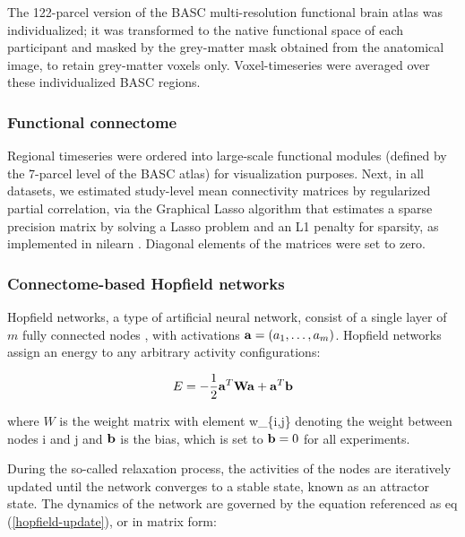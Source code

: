 \documentclass{article}
\begin{document}
The 122-parcel version of the BASC multi-resolution functional brain atlas \citep{bellec2010multi} was individualized; it was transformed to the native functional space of each participant and masked by the  grey-matter mask obtained from the anatomical image, to retain grey-matter voxels only. Voxel-timeseries were averaged over these individualized BASC regions.

\subsubsection{Functional connectome}\label{Functional connectome}

Regional timeseries were ordered into large-scale functional modules (defined by the 7-parcel level of the BASC atlas) for visualization purposes.
Next, in all datasets, we estimated study-level mean connectivity matrices by regularized partial correlation, via the Graphical Lasso algorithm that estimates a sparse precision matrix by solving a Lasso problem and an L1 penalty for sparsity, as implemented in nilearn \citep{abraham2014machine}. Diagonal elements of the matrices were set to zero.

\subsubsection{Connectome-based Hopfield networks}\label{Connectome-based Hopfield networks}

Hopfield networks, a type of artificial neural network, consist of a single layer of $m$ fully connected nodes \citep{hopfield1982neural}, with activations $\bold{a} = (a_1, \dots, a_m )$. Hopfield networks assign an energy to any arbitrary activity configurations:

\begin{equation}
\label{energy-function}
E = - \frac{1}{2}  \bold{a}^{T} \bold{W} \bold{a} + \bold{a}^{T}\bold{b}
\end{equation}

where $W$ is the weight matrix with element w\_\{i,j\} denoting the weight between nodes i and j and $\bold{b}$ is the bias, which is set to $\bold{b} = 0$ for all experiments.

During the so-called relaxation process, the activities of the nodes are iteratively updated until the network converges to a stable state, known as an attractor state. The dynamics of the network are governed by the equation referenced as eq (\ref{hopfield-update}), or in matrix form:
\end{document}

